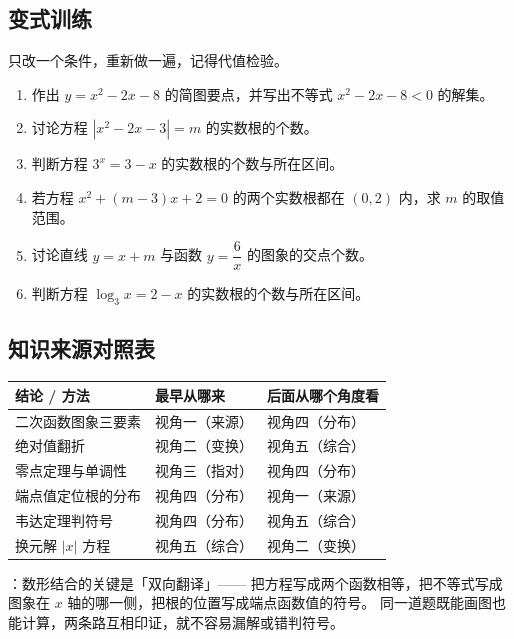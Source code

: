 \begin{inclasstest}
\subsection{变式训练}
只改一个条件，重新做一遍，记得代值检验。
\begin{enumerate}
  \item 作出 $y=x^2-2x-8$ 的简图要点，并写出不等式 $x^2-2x-8<0$ 的解集。
  \item 讨论方程 $|x^2-2x-3|=m$ 的实数根的个数。
  \item 判断方程 $3^x=3-x$ 的实数根的个数与所在区间。
  \item 若方程 $x^2+(m-3)x+2=0$ 的两个实数根都在 $(0,2)$ 内，求 $m$ 的取值范围。
  \item 讨论直线 $y=x+m$ 与函数 $y=\dfrac6x$ 的图象的交点个数。
  \item 判断方程 $\log_3x=2-x$ 的实数根的个数与所在区间。
\end{enumerate}
\end{inclasstest}

\begin{afterclass}
\subsection{知识来源对照表}
\begin{center}
\footnotesize
\setlength{\tabcolsep}{4pt}
\renewcommand{\arraystretch}{1.35}
\begin{tabular}{p{3.4cm}p{4.0cm}p{5.6cm}}
\toprule
结论 / 方法 & 最早从哪来 & 后面从哪个角度看 \\
\midrule
二次函数图象三要素 & 视角一（来源） & 视角四（分布） \\
绝对值翻折 & 视角二（变换） & 视角五（综合） \\
零点定理与单调性 & 视角三（指对） & 视角四（分布） \\
端点值定位根的分布 & 视角四（分布） & 视角一（来源） \\
韦达定理判符号 & 视角四（分布） & 视角五（综合） \\
换元解 $|x|$ 方程 & 视角五（综合） & 视角二（变换） \\
\bottomrule
\end{tabular}
\end{center}

：数形结合的关键是「双向翻译」——
把方程写成两个函数相等，把不等式写成图象在 $x$ 轴的哪一侧，把根的位置写成端点函数值的符号。
同一道题既能画图也能计算，两条路互相印证，就不容易漏解或错判符号。
\end{afterclass}
